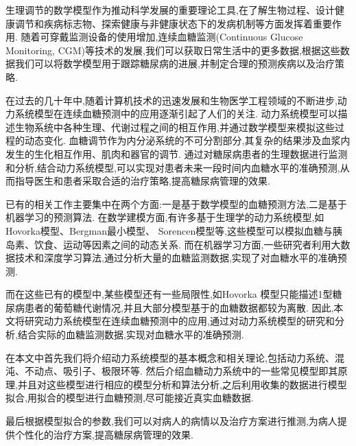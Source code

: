 生理调节的数学模型作为推动科学发展的重要理论工具,在了解生物过程、设计健康调节和疾病标志物、探索健康与非健康状态下的发病机制等方面发挥着重要作用\cite{bakhti2019modelling}. 随着可穿戴监测设备的使用增加\cite{kim2020wearable},连续血糖监测(Continuous Glucose Monitoring, CGM)等技术的发展,我们可以获取日常生活中的更多数据,根据这些数据我们可以将数学模型用于跟踪糖尿病的进展\cite{ha2020type},并制定合理的预测疾病以及治疗策略. 

在过去的几十年中,随着计算机技术的迅速发展和生物医学工程领域的不断进步,动力系统模型在连续血糖预测中的应用逐渐引起了人们的关注. 动力系统模型可以描述生物系统中各种生理、代谢过程之间的相互作用,并通过数学模型来模拟这些过程的动态变化\cite{cobelli2009diabetes}. 血糖调节作为内分泌系统的不可分割部分,其复杂的结果涉及血浆内发生的生化相互作用、肌肉和器官的调节\cite{zavala2019mathematical}. 通过对糖尿病患者的生理数据进行监测和分析,结合动力系统模型,可以实现对患者未来一段时间内血糖水平的准确预测,从而指导医生和患者采取合适的治疗策略,提高糖尿病管理的效果. 

已有的相关工作主要集中在两个方面:一是基于数学模型的血糖预测方法,二是基于机器学习的预测算法. 在数学建模方面,有许多基于生理学的动力系统模型,如Hovorka模型、Bergman最小模型、 Sorencen模型等\cite{pompa2021comparison,mari2001model,de2000mathematical},这些模型可以模拟血糖与胰岛素、饮食、运动等因素之间的动态关系. 而在机器学习方面,一些研究者利用大数据技术和深度学习算法,通过分析大量的血糖监测数据,实现了对血糖水平的准确预测. 

而在这些已有的模型中,某些模型还有一些局限性,如Hovorka 模型只能描述1型糖尿病患者的葡萄糖代谢情况,并且大部分模型基于的血糖数据都较为离散. 因此,本文将研究动力系统模型在连续血糖预测中的应用,通过对动力系统模型的研究和分析,结合实际的血糖监测数据,实现对血糖水平的准确预测. 

在本文中首先我们将介绍动力系统模型的基本概念和相关理论,包括动力系统、混沌、不动点、吸引子、极限环等. 然后介绍血糖动力系统中的一些常见模型即其原理,并且对这些模型进行相应的模型分析和算法分析,之后利用收集的数据进行模型拟合,用拟合的模型进行血糖预测,尽可能接近真实血糖数据. 

最后根据模型拟合的参数,我们可以对病人的病情以及治疗方案进行推测,为病人提供个性化的治疗方案,提高糖尿病管理的效果. 